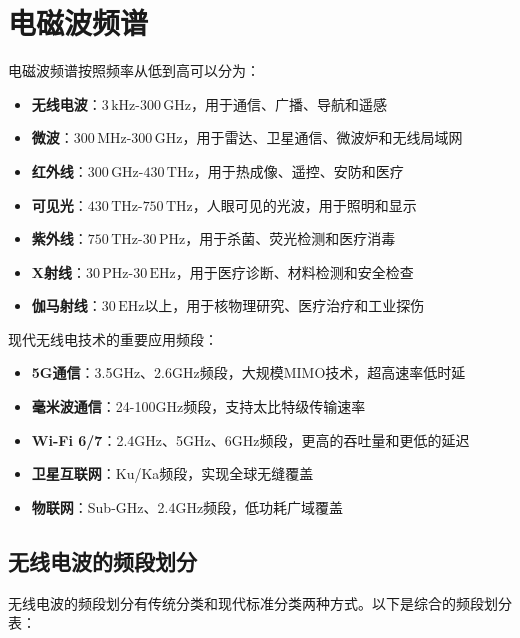 \documentclass[12pt,UTF8]{ctexbook}
\begin{document}
\section{电磁波频谱}

电磁波频谱按照频率从低到高可以分为：

\begin{itemize}[leftmargin=3.5em]
    \item \textbf{无线电波}：$3\,\text{kHz}$-$300\,\text{GHz}$，用于通信、广播、导航和遥感
    \item \textbf{微波}：$300\,\text{MHz}$-$300\,\text{GHz}$，用于雷达、卫星通信、微波炉和无线局域网
    \item \textbf{红外线}：$300\,\text{GHz}$-$430\,\text{THz}$，用于热成像、遥控、安防和医疗
    \item \textbf{可见光}：$430\,\text{THz}$-$750\,\text{THz}$，人眼可见的光波，用于照明和显示
    \item \textbf{紫外线}：$750\,\text{THz}$-$30\,\text{PHz}$，用于杀菌、荧光检测和医疗消毒
    \item \textbf{X射线}：$30\,\text{PHz}$-$30\,\text{EHz}$，用于医疗诊断、材料检测和安全检查
    \item \textbf{伽马射线}：$30\,\text{EHz}$以上，用于核物理研究、医疗治疗和工业探伤
\end{itemize}

现代无线电技术的重要应用频段：
\begin{itemize}[leftmargin=3.5em]
    \item \textbf{5G通信}：3.5GHz、2.6GHz频段，大规模MIMO技术，超高速率低时延
    \item \textbf{毫米波通信}：24-100GHz频段，支持太比特级传输速率
    \item \textbf{Wi-Fi 6/7}：2.4GHz、5GHz、6GHz频段，更高的吞吐量和更低的延迟
    \item \textbf{卫星互联网}：Ku/Ka频段，实现全球无缝覆盖
    \item \textbf{物联网}：Sub-GHz、2.4GHz频段，低功耗广域覆盖
\end{itemize}

\subsection{无线电波的频段划分}

无线电波的频段划分有传统分类和现代标准分类两种方式。以下是综合的频段划分表：
\end{document}
